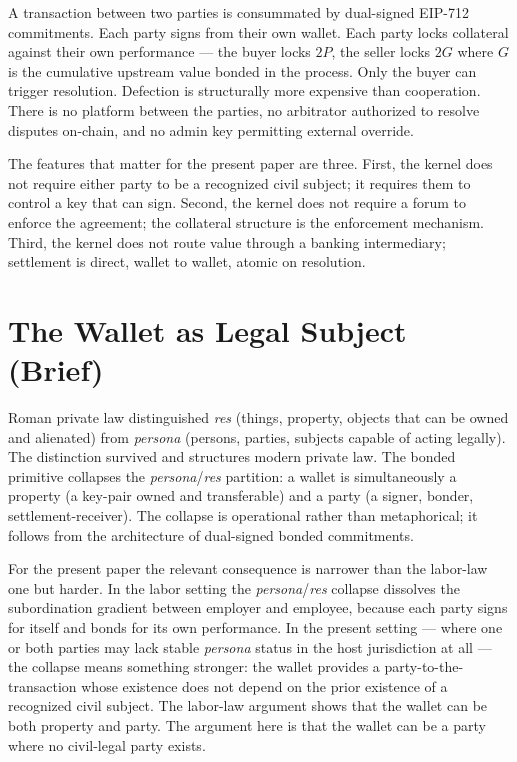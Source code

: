 \documentclass[11pt,a4paper]{article}
\theoremstyle{remark}
\begin{document}
A transaction between two parties is consummated by dual-signed
EIP-712 commitments. Each party signs from their own wallet. Each
party locks collateral against their own performance --- the buyer
locks $2P$, the seller locks $2G$ where $G$ is the cumulative
upstream value bonded in the process. Only the buyer can trigger
resolution. Defection is structurally more expensive than
cooperation. There is no platform between the parties, no
arbitrator authorized to resolve disputes on-chain, and no admin
key permitting external override.

The features that matter for the present paper are three. First,
the kernel does not require either party to be a recognized civil
subject; it requires them to control a key that can sign. Second,
the kernel does not require a forum to enforce the agreement; the
collateral structure is the enforcement mechanism. Third, the
kernel does not route value through a banking intermediary;
settlement is direct, wallet to wallet, atomic on resolution.

\section{The Wallet as Legal Subject (Brief)}
\label{sec:wallet-brief}

Roman private law distinguished \emph{res} (things, property,
objects that can be owned and alienated) from \emph{persona}
(persons, parties, subjects capable of acting legally). The
distinction survived and structures modern private law. The
bonded primitive collapses the
\emph{persona}/\emph{res} partition: a wallet is simultaneously a
property (a key-pair owned and transferable) and a party (a
signer, bonder, settlement-receiver). The collapse is operational
rather than metaphorical; it follows from the architecture of
dual-signed bonded commitments.

For the present paper the relevant consequence is narrower than
the labor-law one but harder. In the labor setting the
\emph{persona}/\emph{res} collapse dissolves the subordination
gradient between employer and employee, because each party signs
for itself and bonds for its own performance. In the present
setting --- where one or both parties may lack stable
\emph{persona} status in the host jurisdiction at all --- the
collapse means something stronger: the wallet provides a
party-to-the-transaction whose existence does not depend on the
prior existence of a recognized civil subject. The labor-law
argument shows that the wallet can be both property and party.
The argument here is that the wallet can be a party where no
civil-legal party exists.
\end{document}
